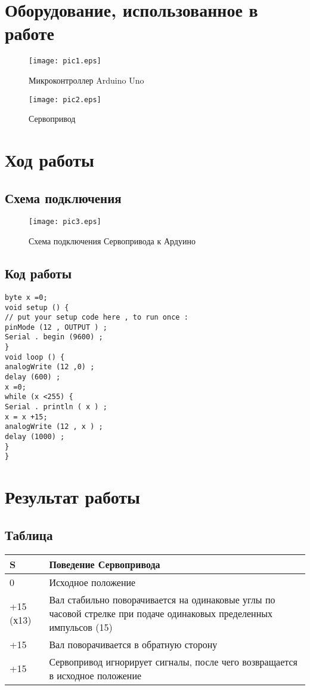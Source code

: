 \documentclass[12pt,a4paper]{scrartcl}
\begin{document}
 	\newpage
 
\section{Оборудование, использованное в работе}
\begin{figure}[h!]  
	\centering
	\texttt{[image: pic1.eps]} %
	\caption{Микроконтроллер Arduino Uno} 
	\label{image:pic1} %
\end{figure}	
\begin{figure}[h!]  
	\centering
	\texttt{[image: pic2.eps]} %
	\caption{Сервопривод} 
	\label{image:pic2} %
\end{figure}
  \newpage
  \section{Ход работы}
  \subsection{Схема подключения}
  \begin{figure}[h!]  
  	\centering
  	\texttt{[image: pic3.eps]} %
  	\caption{Схема подключения Сервопривода к Ардуино} 
  	\label{image:pic3}
  \end{figure}
  \subsection{Код работы}
 \begin{verbatim}
byte x =0;
void setup () {
// put your setup code here , to run once :
pinMode (12 , OUTPUT ) ;
Serial . begin (9600) ;
}
void loop () {
analogWrite (12 ,0) ;
delay (600) ;
x =0;
while (x <255) {
Serial . println ( x ) ;
x = x +15;
analogWrite (12 , x ) ;
delay (1000) ;
}
}

 \end{verbatim}
  \newpage
\section{Результат работы}
\subsection{Таблица}

\begin{tabular}{|p{8cm}|p{8cm}|}
	\hline
\centering	S &  Поведение Сервопривода \\ \hline
0 & Исходное положение \\ \hline
+15 (х13) & Вал стабильно поворачивается на одинаковые углы по часовой стрелке при подаче одинаковых пределенных импульсов (15) \\ \hline
+15 & Вал поворачивается в обратную сторону \\ \hline
+15 & Сервопривод игнорирует сигналы, после чего возвращается в исходное положение  \\ \hline

\end{tabular}
\end{document}
